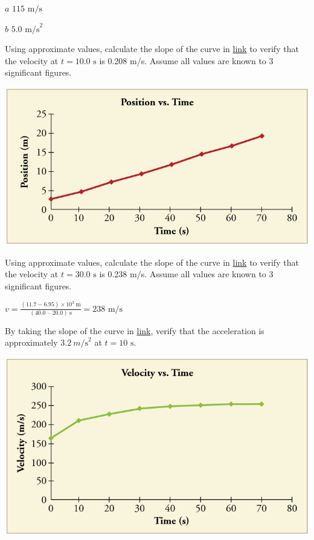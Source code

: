 \documentclass[
]{book}
\newenvironment{problems-exercises}{}{}
\begin{document}
\begin{problems-exercises}
\leavevmode\hypertarget{fs-id2295253}{}%
\(a\) \(\text{115\ m/s}{}\)

\(b\) \({5\text{.}\text{0\ m/s}^{2}}{}\)

\hypertarget{fs-id4012994}{}
\leavevmode\hypertarget{fs-id4012996}{}%
Using approximate values, calculate the slope of the curve in
\protect\hyperlink{import-auto-id4122996}{link} to verify that
the velocity at \({t = \text{10.0\ s}}{}\) is 0.208 m/s. Assume all values
are known to 3 significant figures.

\includegraphics{images/Figure_02_08Sol_13.jpg}

\hypertarget{fs-id1770908}{}
\leavevmode\hypertarget{fs-id1770911}{}%
Using approximate values, calculate the slope of the curve in
\protect\hyperlink{import-auto-id4122996}{link} to verify that
the velocity at \(t = \text{30.0\ s}\) is 0.238 m/s. Assume all values are
known to 3 significant figures.

\leavevmode\hypertarget{fs-id1707522}{}%
\({v = \frac{(\text{11.7} - 6.95) \times \text{10}^{3}\ \text{m}}{(40\text{.}\text{0\ –\ 20}.0)\ \text{s}}} = \text{238\ m/s}\)

\hypertarget{fs-id2475925}{}
\leavevmode\hypertarget{fs-id1744756}{}%
By taking the slope of the curve in
\protect\hyperlink{import-auto-id3552017}{link}, verify that the
acceleration is approximately \({3\text{.}2\ m\text{/s}^{2}}{}\) at
\({t = \text{10\ s}}{}\).

\includegraphics{images/Figure_02_08Sol_14.jpg}


\end{problems-exercises}
\end{document}
